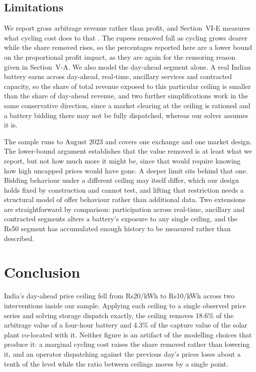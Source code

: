 \documentclass[conference,a4paper]{IEEEtran}
\begin{document}
\subsection{Limitations}

We report gross arbitrage revenue rather than profit, and Section~VI-E measures
what cycling cost does to that \cite{wankmuller2017}. The rupees removed fall as
cycling grows dearer while the share removed rises, so the percentages reported
here are a lower bound on the proportional profit impact, as they are again for
the censoring reason given in Section~V-A. We also model the day-ahead segment
alone. A real Indian battery earns across day-ahead, real-time, ancillary
services and contracted capacity, so the share of total revenue exposed to this
particular ceiling is smaller than the share of day-ahead revenue, and two
further simplifications work in the same conservative direction, since a market
clearing at the ceiling is rationed and a battery bidding there may not be fully
dispatched, whereas our solver assumes it is.

The sample runs to August 2023 and covers one exchange and one market design.
The lower-bound argument establishes that the value removed is at least what we
report, but not how much more it might be, since that would require knowing how
high uncapped prices would have gone. A deeper limit sits behind that one.
Bidding behaviour under a different ceiling may itself differ, which our design
holds fixed by construction and cannot test, and lifting that restriction needs
a structural model of offer behaviour rather than additional data. Two
extensions are straightforward by comparison: participation across real-time,
ancillary and contracted segments alters a battery's exposure to any single
ceiling, and the Rs50 segment has accumulated enough history to be measured
rather than described.

\section{Conclusion}

India's day-ahead price ceiling fell from Rs20/kWh to Rs10/kWh across two
interventions inside our sample. Applying each ceiling to a single observed price
series and solving storage dispatch exactly, the ceiling removes 18.6\% of the
arbitrage value of a four-hour battery and 4.3\% of the capture value of the
solar plant co-located with it. Neither figure is an artifact of the modelling
choices that produce it: a marginal cycling cost raises the share removed rather
than lowering it, and an operator dispatching against the previous day's prices
loses about a tenth of the level while the ratio between ceilings moves by a
single point.
\end{document}
